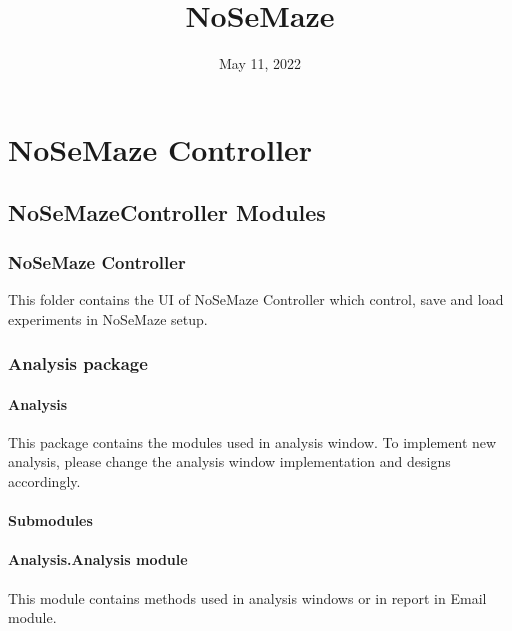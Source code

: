 \documentclass[letterpaper,10pt,english]{sphinxmanual}
\title{NoSeMaze}
\date{May 11, 2022}
\author{}
\begin{document}
\pagestyle{empty}
\sphinxmaketitle
\pagestyle{plain}
\sphinxtableofcontents
\pagestyle{normal}
\label{\detokenize{index::doc}}


\sphinxstepscope


\chapter{NoSeMaze Controller}
\label{\detokenize{NoSeMazeController:nosemaze-controller}}\label{\detokenize{NoSeMazeController::doc}}
\sphinxstepscope


\section{NoSeMazeController Modules}
\label{\detokenize{NoSeMazeController/modules:nosemazecontroller-modules}}\label{\detokenize{NoSeMazeController/modules::doc}}

\subsection{NoSeMaze Controller}
\label{\detokenize{NoSeMazeController/modules:nosemaze-controller}}
\sphinxAtStartPar
This folder contains the UI of NoSeMaze Controller which control, save and load experiments in NoSeMaze setup.

\sphinxstepscope


\subsection{Analysis package}
\label{\detokenize{NoSeMazeController/Analysis:analysis-package}}\label{\detokenize{NoSeMazeController/Analysis::doc}}

\subsubsection{Analysis}
\label{\detokenize{NoSeMazeController/Analysis:analysis}}
\sphinxAtStartPar
This package contains the modules used in analysis window. To implement new analysis, please change the analysis window implementation and designs accordingly.


\subsubsection{Submodules}
\label{\detokenize{NoSeMazeController/Analysis:submodules}}

\subsubsection{Analysis.Analysis module}
\label{\detokenize{NoSeMazeController/Analysis:module-Analysis.Analysis}}\label{\detokenize{NoSeMazeController/Analysis:analysis-analysis-module}}
\sphinxAtStartPar
This module contains methods used in analysis windows or in report in Email
module.
\end{document}
